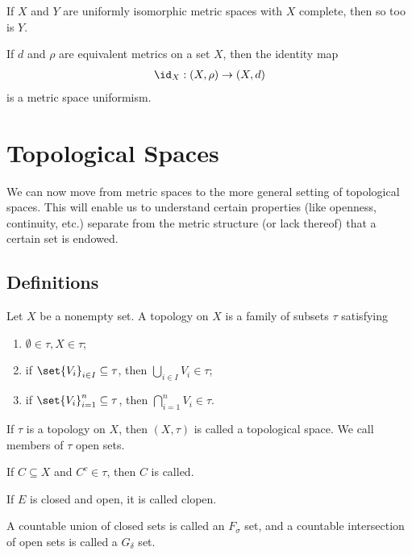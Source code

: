 \begin{fact}
  If $X$ and $Y$ are uniformly isomorphic metric spaces with $X$ complete, then so too is $Y$.\newline

  If $d$ and $\rho$ are equivalent metrics on a set $X$, then the identity map
  \begin{align*}
    \id_{X}:\left(X,\rho\right)\rightarrow \left(X,d\right)
  \end{align*}
  is a metric space uniformism.
\end{fact}
\section{Topological Spaces}%
We can now move from metric spaces to the more general setting of topological spaces. This will enable us to understand certain properties (like openness, continuity, etc.) separate from the metric structure (or lack thereof) that a certain set is endowed.
\subsection{Definitions}%
\begin{definition}
  Let $X$ be a nonempty set. A topology on $X$ is a family of subsets $\tau$ satisfying
  \begin{enumerate}[(1)]
    \item $\emptyset\in \tau,X\in \tau$;
    \item if $\set{V_i}_{i\in I}\subseteq \tau$, then $\bigcup_{i\in I}V_i\in \tau$;
    \item if $\set{V_i}_{i=1}^{n}\subseteq \tau$, then $\bigcap_{i=1}^{n}V_i \in \tau$.
  \end{enumerate}
  If $\tau$ is a topology on $X$, then $\left(X,\tau\right)$ is called a topological space. We call members of $\tau$ open sets.\newline

  If $C\subseteq X$ and $C^{c}\in \tau$, then $C$ is called.\newline

  If $E$ is closed and open, it is called clopen.\newline

  A countable union of closed sets is called an $F_{\sigma}$ set, and a countable intersection of open sets is called a $G_{\delta}$ set.
\end{definition}

